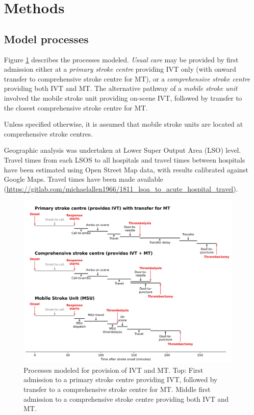 \section{Methods}

\subsection{Model processes}

Figure \ref{fig:process} describes the processes modeled. \textit{Usual care} may be provided by first admission either at a \textit{primary stroke centre} providing IVT only (with onward transfer to comprehensive stroke centre for MT), or a \textit{comprehensive stroke centre} providing both IVT and MT. The alternative pathway of a \textit{mobile stroke unit} involved the mobile stroke unit providing on-scene IVT, followed by transfer to the closest comprehensive stroke centre for MT.

Unless specified otherwise, it is assumed that mobile stroke units are located at comprehensive stroke centres.

Geographic analysis was undertaken at Lower Super Output Area (LSO) level. Travel times from each LSOS to all hospitals and travel times between hospitals have been estimated using Open Street Map data, with results calibrated against Google Maps. Travel times have been made available (\url{https://gitlab.com/michaelallen1966/1811_lsoa_to_acute_hospital_travel}).

\begin{figure}
    \centering
    \includegraphics[width=0.85\linewidth]{images/stroke_treatment.jpg}
    \caption{Processes modeled for provision of IVT and MT. Top: First admission to a primary stroke centre providing IVT, followed by transfer to a comprehensive stroke centre for MT. Middle first admission to a comprehensive stroke centre providing both IVT and MT. }
    \label{fig:process}
\end{figure}

